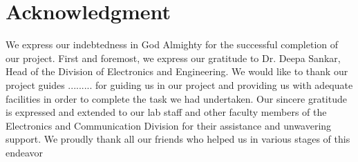 \chapter*{Acknowledgment}
We express our indebtedness in God Almighty for the successful completion of
our project. First and foremost, we express our gratitude to Dr. Deepa Sankar, Head of the
Division of Electronics and Engineering. We would like to thank our project guides
......... for guiding us in
our project and providing us with adequate facilities in order to complete the task we had
undertaken.
Our sincere gratitude is expressed and extended to our lab staff and other faculty members of
the Electronics and Communication Division for their assistance and unwavering support.
We proudly thank all our friends who helped us in various stages of this endeavor

